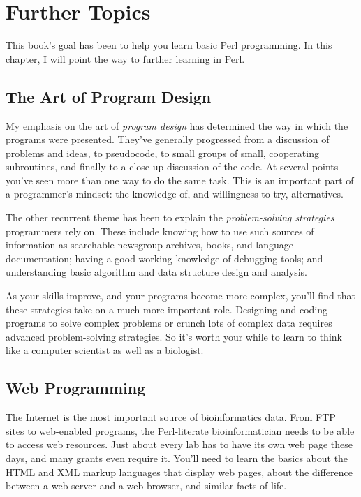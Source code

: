 \chapter{Further Topics}
\label{chap:chapter13}
\minitoc

This book's goal has been to help you learn basic Perl programming. In this chapter, I will point the way to further learning in Perl. 

\section{The Art of Program Design}
My emphasis on the art of \textit{program design} has determined the way in which the programs were presented. They've generally progressed from a discussion of problems and ideas, to pseudocode, to small groups of small, cooperating subroutines, and finally to a close-up discussion of the code. At several points you've seen more than one way to do the same task. This is an important part of a programmer's mindset: the knowledge of, and willingness to try, alternatives.

The other recurrent theme has been to explain the \textit{problem-solving strategies} programmers rely on. These include knowing how to use such sources of information as searchable newsgroup archives, books, and language documentation; having a good working knowledge of debugging tools; and understanding basic algorithm and data structure design and analysis.

As your skills improve, and your programs become more complex, you'll find that these strategies take on a much more important role. Designing and coding programs to solve complex problems or crunch lots of complex data requires advanced problem-solving strategies. So it's worth your while to learn to think like a computer scientist as well as a biologist. 

\section{Web Programming}
The Internet is the most important source of bioinformatics data. From FTP sites to web-enabled programs, the Perl-literate bioinformatician needs to be able to access web resources. Just about every lab has to have its own web page these days, and many grants even require it.  You'll need to learn the basics about the HTML and XML markup languages that display web pages, about the difference between a web server and a web browser, and similar facts of life.

